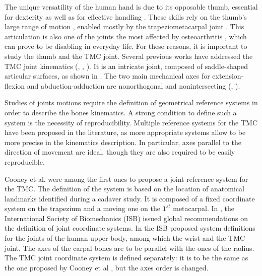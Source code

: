 The unique versatility of the human hand is due to its opposable thumb, essential for dexterity as well as for effective handling \cite{jones_2006_human}. These skills rely on the thumb's large range of motion \cite{cooney_1981_kinesiology}, enabled mostly by the trapeziometacarpal joint . %
This articulation is also one of the joints the most affected by osteoarthritis \cite{marshall_2010_radiographic}, 
which can prove to be disabling in everyday life. 
For these reasons, it is important to study the thumb and the TMC joint. 
Several previous works have addressed the TMC joint kinematics (\cite{halilaj_2014_vivo}, \cite{crisco_2015_vivo}, \cite{kawanishi_2018_vivo}). It is an intricate joint, composed of saddle-shaped articular surfaces, as shown in . The two main mechanical axes for extension-flexion and abduction-adduction are nonorthogonal and nonintersecting (\cite{hollister_1992_axes}, \cite{crisco_2015_vivo}). 

Studies of joints motions require the definition of geometrical reference systems in order to describe the bones kinematics. A strong condition to define such a system is the necessity of reproducibility. Multiple reference systems for the TMC have been proposed in the literature, as more appropriate systems allow to be more precise in the kinematics description. In particular, axes parallel to the direction of movement are ideal, though they are also required to be easily reproducible. %

Cooney et al. \cite{cooney_1981_kinesiology} were among the first ones to propose a joint reference system for the TMC. The definition of the system is based on the location of anatomical landmarks identified during a cadaver study. It is composed of a fixed coordinate system on the trapezium and a moving one on the $1^{st}$ metacarpal. In \cite{wu_1995_isb}, the International Society of Biomechanics (ISB) issued global recommendations on the definition of joint coordinate systems. In \cite{wu_2005_isb} the ISB proposed system definitions for the joints of the human upper body, among which the wrist and the TMC joint. The axes of the carpal bones are to be parallel with the ones of the radius. The TMC joint coordinate system is defined separately: it is to be the same as the one proposed by Cooney et al \cite{cooney_1981_kinesiology}, but the axes order is changed. 
 
